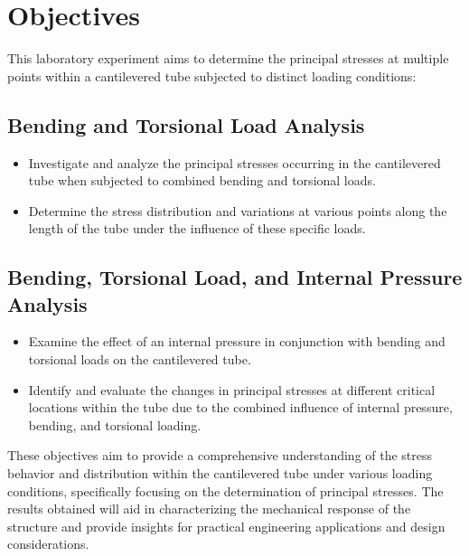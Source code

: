 \documentclass[12pt, titlepage]{article}
\begin{document}
\tableofcontents
\listoffigures
\listoftables
\thispagestyle{tocstyle}
\newpage
\section{Objectives}
This laboratory experiment aims to determine the principal stresses at multiple
points within a cantilevered tube subjected to distinct loading conditions:

\subsection{Bending and Torsional Load Analysis}
\begin{itemize}
    \item Investigate and analyze the principal stresses occurring in the
      cantilevered tube when subjected to combined bending and torsional loads.
    \item Determine the stress distribution and variations at various points
      along the length of the tube under the influence of these specific loads.
\end{itemize}

\subsection{Bending, Torsional Load, and Internal Pressure Analysis}
\begin{itemize}
    \item Examine the effect of an internal pressure in conjunction with
      bending and torsional loads on the cantilevered tube. 
    \item Identify and
      evaluate the changes in principal stresses at different critical
      locations within the tube due to the combined influence of internal
      pressure, bending, and torsional loading.
\end{itemize}

These objectives aim to provide a comprehensive understanding of the stress
behavior and distribution within the cantilevered tube under various loading
conditions, specifically focusing on the determination of principal stresses.
The results obtained will aid in characterizing the mechanical response of the
structure and provide insights for practical engineering applications and
design considerations.
\newpage
\end{document}
